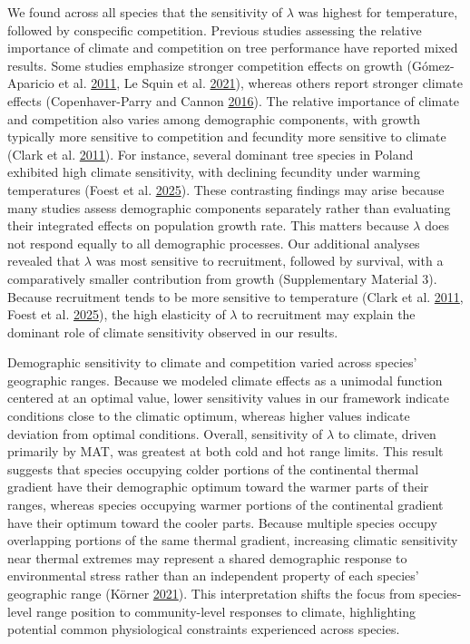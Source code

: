 \documentclass[12pt]{article}
\begin{document}
We found across all species that the sensitivity of \(\lambda\) was
highest for temperature, followed by conspecific competition. Previous
studies assessing the relative importance of climate and competition on
tree performance have reported mixed results. Some studies emphasize
stronger competition effects on growth (Gómez-Aparicio et al.
\protect\hyperlink{ref-GomezAparicio2011}{2011}, Le Squin et al.
\protect\hyperlink{ref-LeSquin2021}{2021}), whereas others report
stronger climate effects (Copenhaver-Parry and Cannon
\protect\hyperlink{ref-CopenhaverParry2016}{2016}). The relative
importance of climate and competition also varies among demographic
components, with growth typically more sensitive to competition and
fecundity more sensitive to climate (Clark et al.
\protect\hyperlink{ref-Clark2011}{2011}). For instance, several dominant
tree species in Poland exhibited high climate sensitivity, with
declining fecundity under warming temperatures (Foest et al.
\protect\hyperlink{ref-foest2025forest}{2025}). These contrasting
findings may arise because many studies assess demographic components
separately rather than evaluating their integrated effects on population
growth rate. This matters because \(\lambda\) does not respond equally
to all demographic processes. Our additional analyses revealed that
\(\lambda\) was most sensitive to recruitment, followed by survival,
with a comparatively smaller contribution from growth (Supplementary
Material 3). Because recruitment tends to be more sensitive to
temperature (Clark et al. \protect\hyperlink{ref-Clark2011}{2011}, Foest
et al. \protect\hyperlink{ref-foest2025forest}{2025}), the high
elasticity of \(\lambda\) to recruitment may explain the dominant role
of climate sensitivity observed in our results.

Demographic sensitivity to climate and competition varied across
species' geographic ranges. Because we modeled climate effects as a
unimodal function centered at an optimal value, lower sensitivity values
in our framework indicate conditions close to the climatic optimum,
whereas higher values indicate deviation from optimal conditions.
Overall, sensitivity of \(\lambda\) to climate, driven primarily by MAT,
was greatest at both cold and hot range limits. This result suggests
that species occupying colder portions of the continental thermal
gradient have their demographic optimum toward the warmer parts of their
ranges, whereas species occupying warmer portions of the continental
gradient have their optimum toward the cooler parts. Because multiple
species occupy overlapping portions of the same thermal gradient,
increasing climatic sensitivity near thermal extremes may represent a
shared demographic response to environmental stress rather than an
independent property of each species' geographic range (Körner
\protect\hyperlink{ref-Korner2021}{2021}). This interpretation shifts
the focus from species-level range position to community-level responses
to climate, highlighting potential common physiological constraints
experienced across species.
\end{document}
